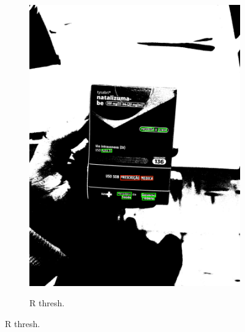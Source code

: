 \begin{figure}[htb]
\begin{subfigure}[t]{0.21\textwidth}
        \includegraphics[width=\linewidth]{../pictures/tysabri_gray_thresh_boxes.jpg}
    \end{subfigure}
    \hfill
    \begin{subfigure}[t]{0.21\textwidth}
        \centering
        \caption{R thresh.}
        \label{fig:foto:versoes:1:R_thresh:boxes}

\end{subfigure}
\end{figure}
